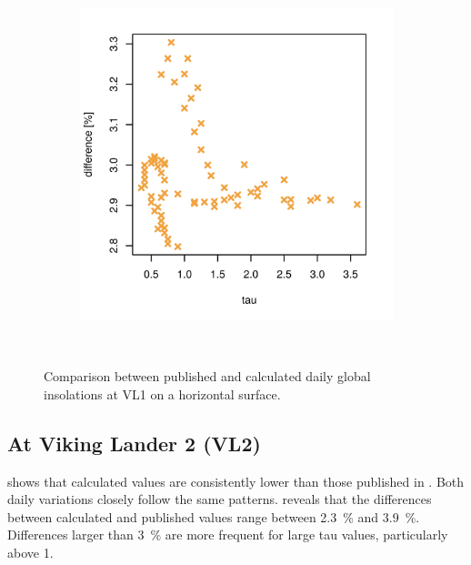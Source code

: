 \begin{figure}[H]
\begin{subfigure}[t]{\subfigureWidth}
            \includegraphics[height=\graphicsHeight]{sections/appendix/insolation-calculation-verification/plots/hh-diff-bet-exp-calc-at-vl1.png}
            \label{fig:sub:comparative-global-insolation-at-vl1-horizontal-percentage-differences}
    \end{subfigure}\\[0.8ex]
    \caption{Comparison between published and calculated daily global insolations at \ac{VL1} on a horizontal surface.}
    \label{fig:plot:comparative-global-insolation-at-vl1-horizontal}
\vspace{-2ex}
\end{figure}

\subsection{At Viking Lander 2 (VL2)}
 shows that calculated values are consistently lower than those published in . Both daily variations closely follow the same patterns.  reveals that the differences between calculated and published values range between \SI{2.3}{\percent} and \SI{3.9}{\percent}. Differences larger than \SI{3}{\percent} are more frequent for large tau values, particularly above 1.

